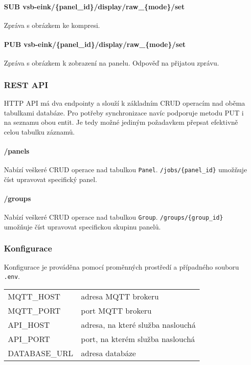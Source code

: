 \paragraph*{SUB vsb-eink/\{panel\_id\}/display/raw\_\{mode\}/set}
Zpráva s obrázkem ke kompresi.

\paragraph*{PUB vsb-eink/\{panel\_id\}/display/raw\_\{mode\}/set}
Zpráva s obrázkem k zobrazení na panelu. Odpověď na přijatou zprávu.

\subsubsection{REST API}
HTTP API má dva endpointy a slouží k základním CRUD operacím nad oběma tabulkami databáze. Pro potřeby synchronizace navíc podporuje metodu PUT i na seznamu obou entit. Je tedy možné jediným požadavkem přepsat efektivně celou tabulku záznamů.

\paragraph*{/panels}
Nabízí veškeré CRUD operace nad tabulkou \lstinline|Panel|. \lstinline|/jobs/{panel_id}| umožňuje číst upravovat specifický panel.

\paragraph*{/groups}
Nabízí veškeré CRUD operace nad tabulkou \lstinline|Group|. \lstinline|/groups/{group_id}| umožňuje číst upravovat specifickou skupinu panelů.

\subsubsection{Konfigurace}
Konfigurace je prováděna pomocí proměnných prostředí a případného souboru \lstinline{.env}.
\begin{table}[h]
    \begin{tabular}{ll}
        MQTT\_HOST & adresa MQTT brokeru \\
        MQTT\_PORT & port MQTT brokeru \\
        API\_HOST & adresa, na které služba naslouchá \\
        API\_PORT & port, na kterém služba naslouchá \\
        DATABASE\_URL & adresa databáze \\
    \end{tabular}
\end{table}

